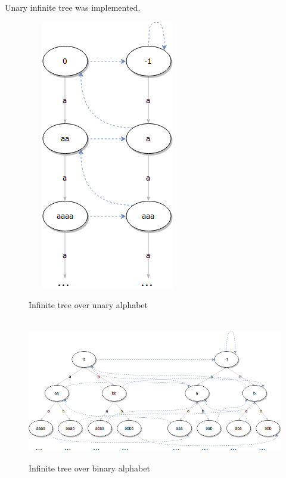  Unary infinite tree was implemented\cite{fizruk}.
\begin{figure}[H]
  \centering
     \includegraphics[width=0.4\linewidth]{unary.png}
 \caption{Infinite tree over unary alphabet}
\end{figure}
\begin{figure}[H]
  \centering
     \includegraphics[width=\linewidth]{binary.png}
 \caption{Infinite tree over binary alphabet}
\end{figure}
